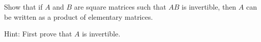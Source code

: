 
\begin{Exercise}[
name={},
title={}, 
difficulty=0,
origin={\cite{AG}}]
Show that if $A$ and $B$ are square matrices such that $AB$ is invertible, then $A$ can be written as a product of elementary matrices.
\end{Exercise}

\begin{Answer}
Hint: First prove that $A$ is invertible. 
\end{Answer}
